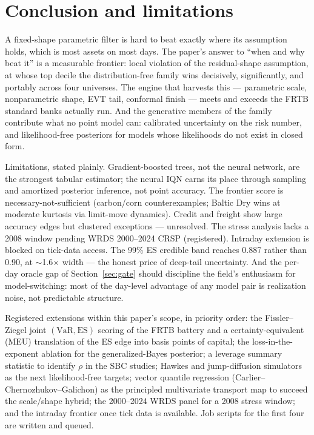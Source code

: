 \documentclass[11pt]{article}
\newcommand{\VaR}{\mathrm{VaR}}
\newcommand{\ES}{\mathrm{ES}}
\theoremstyle{remark}
\begin{document}
\section{Conclusion and limitations}\label{sec:limitations}

A fixed-shape parametric filter is hard to beat exactly where its
assumption holds, which is most assets on most days. The paper's answer
to ``when and why beat it'' is a measurable frontier: local violation of
the residual-shape assumption, at whose top decile the distribution-free
family wins decisively, significantly, and portably across four
universes. The engine that harvests this --- parametric scale,
nonparametric shape, EVT tail, conformal finish --- meets and exceeds
the FRTB standard banks actually run. And the generative members of the
family contribute what no point model can: calibrated uncertainty on the
risk number, and likelihood-free posteriors for models whose likelihoods
do not exist in closed form.

Limitations, stated plainly. Gradient-boosted trees, not the neural
network, are the strongest tabular estimator; the neural IQN earns its
place through sampling and amortized posterior inference, not point
accuracy. The frontier score is necessary-not-sufficient (carbon/corn
counterexamples; Baltic Dry wins at moderate kurtosis via limit-move
dynamics). Credit and freight show large accuracy edges but clustered
exceptions --- unresolved. The stress analysis lacks a 2008 window
pending WRDS 2000--2024 CRSP (registered). Intraday extension is blocked
on tick-data access. The 99\% ES credible band reaches 0.887 rather than
0.90, at $\sim$1.6$\times$ width --- the honest price of deep-tail
uncertainty.
And the per-day oracle gap of Section~\ref{sec:gate} should discipline
the field's enthusiasm for model-switching: most of the day-level
advantage of any model pair is realization noise, not predictable
structure.

Registered extensions within this paper's scope, in priority order:
the Fissler--Ziegel joint $(\VaR,\ES)$ scoring of the FRTB battery and a
certainty-equivalent (MEU) translation of the ES edge into basis points
of capital; the loss-in-the-exponent ablation for the generalized-Bayes
posterior; a leverage summary statistic to identify $\rho$ in the SBC
studies; Hawkes and jump-diffusion simulators as the next
likelihood-free targets; vector quantile regression
(Carlier--Chernozhukov--Galichon) as the principled multivariate
transport map to succeed the scale/shape hybrid; the 2000--2024 WRDS
panel for a 2008 stress window; and the intraday frontier once tick
data is available. Job scripts for the first four are written and
queued.
\end{document}
